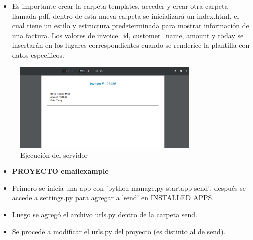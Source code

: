 \documentclass{article}
\begin{document}
        \begin{itemize}
            \item Es importante crear la carpeta templates, acceder y crear otra carpeta llamada pdf, dentro de esta nueva carpeta se inicializará un index.html, el cual tiene un estilo y estructura predeterminada para mostrar información de una factura. Los valores de invoice\_id, customer\_name, amount y today se insertarán en los lugares correspondientes cuando se renderice la plantilla con datos específicos.
        \end{itemize}
         
        \begin{figure}[H]
        \centering
        \includegraphics[width=0.8\textwidth]{img/pdfexample.png}
        \caption*{Ejecución del servidor}
        \end{figure}
        \vspace{0.5cm} %
        \begin{itemize}	
		\item \textbf{PROYECTO emailexample}
            \item Primero se inicia una app con 'python manage.py startapp send', después se accede a settings.py para agregar a 'send' en INSTALLED APPS.
            \item Luego se agregó el archivo urls.py dentro de la carpeta send.
        \end{itemize} 
         
        \begin{itemize}	
            \item Se procede a modificar el urls.py del proyecto (es distinto al de send).
        \end{itemize}
         
\end{document}
